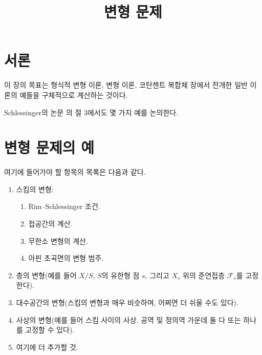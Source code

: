 

%


\title{변형 문제}

\maketitle

\label{section-phantom}

\tableofcontents

\section{서론}
\label{section-introduction}

\noindent
이 장의 목표는 형식적 변형 이론, 변형 이론, 코탄젠트 복합체 장에서
전개한 일반 이론의 예들을 구체적으로 계산하는 것이다.

\medskip\noindent
Schlessinger의 논문 \cite{Sch}의 절 3에서도 몇 가지 예를 논의한다.






\section{변형 문제의 예}
\label{section-examples}

\noindent
여기에 들어가야 할 항목의 목록은 다음과 같다.
\begin{enumerate}
\item 스킴의 변형:
\begin{enumerate}
\item Rim--Schlessinger 조건.
\item 접공간의 계산.
\item 무한소 변형의 계산.
\item 아핀 초곡면의 변형 범주.
\end{enumerate}
\item 층의 변형(예를 들어 $X/S$, $S$의 유한형 점 $s$, 그리고
$X_s$ 위의 준연접층 $\mathcal{F}_s$를 고정한다).
\item 대수공간의 변형(스킴의 변형과 매우 비슷하며, 어쩌면 더 쉬울 수도 있다).
\item 사상의 변형(예를 들어 스킴 사이의 사상. 공역 및 정의역 가운데
둘 다 또는 하나를 고정할 수 있다).
\item 여기에 더 추가할 것.
\end{enumerate}





